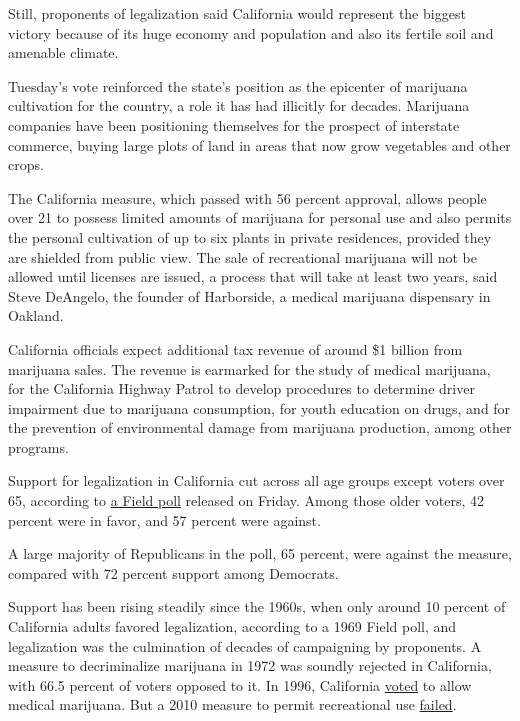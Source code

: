 Still, proponents of legalization said California would represent the
biggest victory because of its huge economy and population and also its
fertile soil and amenable climate.

Tuesday's vote reinforced the state's position as the epicenter of
marijuana cultivation for the country, a role it has had illicitly for
decades. Marijuana companies have been positioning themselves for the
prospect of interstate commerce, buying large plots of land in areas
that now grow vegetables and other crops.

The California measure, which passed with 56 percent approval, allows
people over 21 to possess limited amounts of marijuana for personal use
and also permits the personal cultivation of up to six plants in private
residences, provided they are shielded from public view. The sale of
recreational marijuana will not be allowed until licenses are issued, a
process that will take at least two years, said Steve DeAngelo, the
founder of Harborside, a medical marijuana dispensary in Oakland.

California officials expect additional tax revenue of around \$1 billion
from marijuana sales. The revenue is earmarked for the study of medical
marijuana, for the California Highway Patrol to develop procedures to
determine driver impairment due to marijuana consumption, for youth
education on drugs, and for the prevention of environmental damage from
marijuana production, among other programs.

Support for legalization in California cut across all age groups except
voters over 65, according to
\href{http://field.com/fieldpollonline/subscribers/Rls2555.pdf}{a Field
poll} released on Friday. Among those older voters, 42 percent were in
favor, and 57 percent were against.

A large majority of Republicans in the poll, 65 percent, were against
the measure, compared with 72 percent support among Democrats.

Support has been rising steadily since the 1960s, when only around 10
percent of California adults favored legalization, according to a 1969
Field poll, and legalization was the culmination of decades of
campaigning by proponents. A measure to decriminalize marijuana in 1972
was soundly rejected in California, with 66.5 percent of voters opposed
to it. In 1996, California
\href{http://www.nytimes3xbfgragh.onion/1996/11/17/us/votes-on-marijuana-are-stirring-debate.html}{voted}
to allow medical marijuana. But a 2010 measure to permit recreational
use
\href{http://www.nytimes3xbfgragh.onion/2010/11/03/us/politics/03ballot.html}{failed}.

